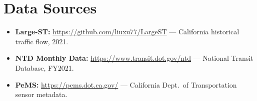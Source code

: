 \documentclass[12pt,a4paper]{article}
\begin{document}
\section{Data Sources}

\begin{itemize}
    \item \textbf{Large-ST:} \url{https://github.com/liuxu77/LargeST} — California historical traffic flow, 2021.
    \item \textbf{NTD Monthly Data:} \url{https://www.transit.dot.gov/ntd} — National Transit Database, FY2021.
    \item \textbf{PeMS:} \url{https://pems.dot.ca.gov/} — California Dept.\ of Transportation sensor metadata.
\end{itemize}
\end{document}
